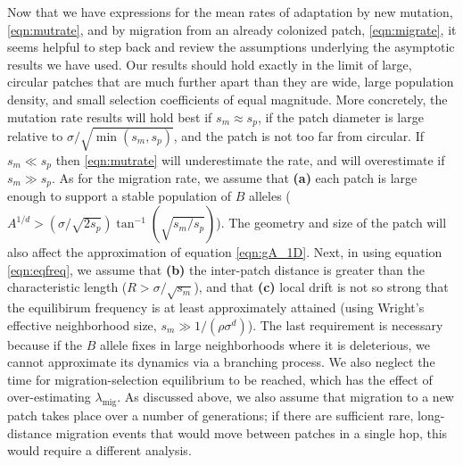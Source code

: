 \documentclass{article}
\newcommand{\migrate}{\lambda_\text{mig}}
\begin{document}
Now that we have expressions for the mean rates of adaptation by new mutation, \eqref{eqn:mutrate},
and by migration from an already colonized patch, \eqref{eqn:migrate},
it seems helpful to step back and review the assumptions 
underlying the asymptotic results we have used.
Our results should hold exactly in the limit of 
large, circular patches that are much further apart than they are wide,
large population density,
and small selection coefficients of equal magnitude.
More concretely, the mutation rate results will hold best if $s_m \approx s_p$,
if the patch diameter is large relative to $\sigma/\sqrt{\min(s_m,s_p)}$,
and the patch is not too far from circular.
If $s_m \ll s_p$ then \eqref{eqn:mutrate} will underestimate the rate,
and will overestimate if $s_m \gg s_p$.
As for the migration rate,
we assume that 
\textbf{(a)} each patch is large enough to support a stable population of $B$ alleles
($A^{1/d} > (\sigma/\sqrt{2s_p}) \tan^{-1}(\sqrt{s_m/s_p})$).
The geometry and size of the patch will also affect the approximation of equation \eqref{eqn:gA_1D}.
Next, in using equation \eqref{eqn:eqfreq}, we assume that 
\textbf{(b)} the inter-patch distance is greater than the characteristic length
($R > \sigma/\sqrt{s_m}$),
and that
\textbf{(c)} local drift is not so strong that the equilibirum frequency is at least approximately attained
(using Wright's effective neighborhood size, $s_m \gg 1/(\rho \sigma^d)$).
The last requirement is necessary because if the $B$ allele fixes in large neighborhoods where it is deleterious,
we cannot approximate its dynamics via a branching process.
We also neglect the time for migration-selection equilibrium to be reached,
which has the effect of over-estimating $\migrate$.
As discussed above, we also assume that migration to a new patch takes place over a number of generations;
if there are sufficient rare, long-distance migration events
that would move between patches in a single hop,
this would require a different analysis.
\end{document}
